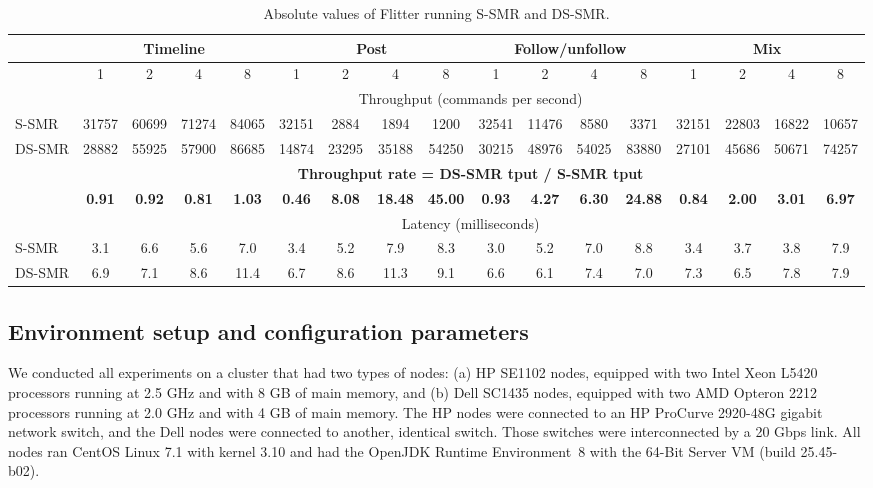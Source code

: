 \begin{table}[htdp]
\vspace{10mm}
\caption{Absolute values of Flitter running S-SMR and DS-SMR.}
\centering
\begin{tabular}{|l|c|c|c|c|c|c|c|c|c|c|c|c|c|c|c|c|} \hline
& \multicolumn{4}{|c|}{Timeline}	 &  \multicolumn{4}{|c|}{Post} &  \multicolumn{4}{|c|}{Follow/unfollow} &  \multicolumn{4}{|c|}{Mix} \\ \hline
		& 1	      & 2	   & 4		 & 8	       & 1	     & 2	 & 4		 & 8	     & 1	  & 2		 & 4	        & 8	     & 1	   & 2		& 4	       & 8	 \\ \hline\hline
		& \multicolumn{16}{|c|}{Throughput (commands per second)} \\ \hline
S-SMR  	& 31757 & 60699 & 71274 & 84065 & 32151 & 2884  & 1894	 & 1200   & 32541 & 11476 & 8580    & 3371   & 32151 & 22803 & 16822 & 10657 \\ \hline
DS-SMR	& 28882 & 55925 & 57900 & 86685 & 14874 & 23295 & 35188	 & 54250 & 30215 & 48976 & 54025	& 83880 & 27101 & 45686 & 50671 & 74257 \\ \hline\hline
		& \multicolumn{16}{|c|}{\textbf{Throughput rate = DS-SMR tput / S-SMR tput}} \\ \hline
		& \textbf{0.91} & \textbf{0.92}	& \textbf{0.81} & \textbf{1.03}  		& \textbf{0.46}  & \textbf{8.08}	  & \textbf{18.48}	 & \textbf{45.00}  & \textbf{0.93}    & \textbf{4.27}	  & \textbf{6.30}	& \textbf{24.88}  & \textbf{0.84}	    & \textbf{2.00}	& \textbf{3.01}	& \textbf{6.97}	 \\ \hline\hline
		& \multicolumn{16}{|c|}{Latency (milliseconds)} \\ \hline
S-SMR	& 3.1 & 6.6 & 5.6 & 7.0  & 3.4	& 5.2		& 7.9		& 8.3		& 3.0		& 5.2		& 7.0		& 8.8		& 3.4		& 3.7		& 3.8		& 7.9	 \\ \hline
DS-SMR	& 6.9 & 7.1 & 8.6 & 11.4 & 6.7	& 8.6		& 11.3	& 9.1		& 6.6		& 6.1		& 7.4		& 7.0		& 7.3		& 6.5		& 7.8		& 7.9	 \\ \hline
\end{tabular}
\label{tbl:results}
\vspace{10mm}
\end{table}%

\subsection{Environment setup and configuration parameters}
\label{sec:evaluation:setup}

We conducted all experiments on a cluster that had two types of nodes: (a) HP SE1102 nodes, equipped with two Intel Xeon L5420 processors running at 2.5 GHz and with 8 GB of main memory, and (b) Dell SC1435 nodes, equipped with two AMD Opteron 2212 processors running at 2.0 GHz and with 4 GB of main memory. The HP nodes were connected to an HP ProCurve 2920-48G gigabit network switch, and the Dell nodes were connected to another, identical switch. Those switches were interconnected by a 20 Gbps link.
All nodes ran CentOS Linux 7.1 with kernel 3.10 and had the OpenJDK Runtime Environment~8 with the \mbox{64-Bit} Server VM (build 25.45-b02).

